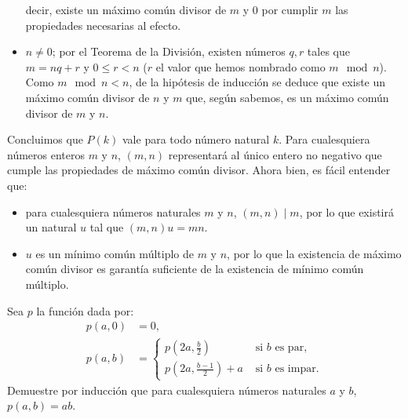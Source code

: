 \begin{solution}
\begin{itemize}
  decir, existe un máximo común divisor de $m$ y $0$ por cumplir $m$
  las propiedades necesarias al efecto.
\item $n\neq 0$; por el Teorema de la División, existen números $q,r$
  tales que $m=nq+r$ y $0\leq r<n$ ($r$ el valor que hemos nombrado
  como $m\mod n$). Como $m\mod n <n$, de la hipótesis de inducción se
  deduce que existe un máximo común divisor de $n$ y $m$ que, según
  sabemos, es un máximo común divisor de $m$ y $n$.
\end{itemize}
Concluimos que $P(k)$ vale para todo número natural $k$. Para
cualesquiera números enteros $m$ y $n$, $(m,n)$ representará al único
entero no negativo que cumple las propiedades de máximo común
divisor. Ahora bien, es fácil entender que:
\begin{itemize}
\item para cualesquiera números naturales $m$ y $n$, $(m,n)\mid m$,
  por lo que existirá un natural $u$ tal que $(m,n)u=mn$.
\item $u$ es un mínimo común múltiplo de $m$ y $n$, por lo que la
  existencia de máximo común divisor es garantía suficiente de la
  existencia de mínimo común múltiplo.
\end{itemize}
\end{solution}

\begin{exercise}
  \label{00_induc_16}
  Sea $p$ la función dada por:
  \begin{align*}
    p(a,0)&=0,\\
    p(a,b)&=
            \begin{cases}
              p\left(2a,\frac{b}{2}\right)&\text{ si $b$ es par,}\\
              p\left(2a,\frac{b-1}{2}\right)+a&\text{ si $b$ es impar.}
            \end{cases}
  \end{align*}
  Demuestre por inducción que para cualesquiera números naturales $a$
  y $b$, $p(a,b)=ab$.
\end{exercise}

